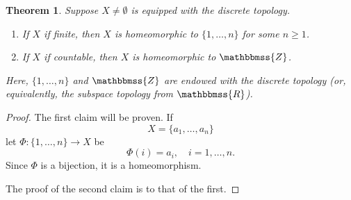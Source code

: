 \documentclass[12pt]{article}
\newcommand{\Z}{\mathbbmss{Z}}
\newcommand{\R}{\mathbbmss{R}}
\newtheorem{thm}{Theorem}
\begin{document}
\begin{thm}
Suppose $X\neq \emptyset$ is equipped with the discrete topology.
\begin{enumerate}
\item If $X$ if finite, then $X$ is homeomorphic to $\{1,\ldots, n\}$
  for some $n\ge 1$.
\item If $X$ if countable, then $X$ is homeomorphic to $\Z$.
\end{enumerate}
Here, $\{1,\ldots, n\}$ and $\Z$ are endowed with the discrete topology 
(or, equivalently, the subspace topology from $\R$).
\end{thm}

\begin{proof} The first claim will be proven. If 
  $$
     X=\{a_1,\ldots, a_n\}
  $$
let $\Phi\colon \{1,\ldots, n\} \to X$ be
  $$
    \Phi(i)=a_i,\quad i=1,\ldots, n.
  $$
Since $\Phi$ is a bijection, it is a homeomorphism.

The proof of the second claim is  to that of the first. 
\end{proof}
\end{document}
